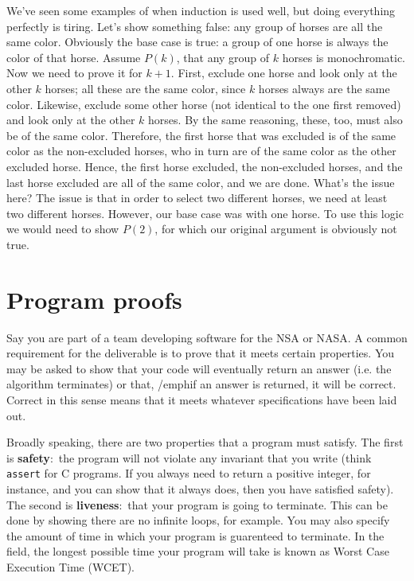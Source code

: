 \documentclass[nobib]{tufte-handout}
\newcommand{\defn}[2]{\noindent\textbf{#1}:\ #2}
\begin{document}
We've seen some examples of when induction is used well, but doing everything 
perfectly is tiring. Let's show something false: any group of horses are 
all the same color. Obviously the base case is true: a group of one horse 
is always the color of that horse. Assume $P(k)$, that any group of $k$ horses 
is monochromatic. Now we need to prove it for $k+1$. First, exclude one horse and 
look only at the other $k$ horses; all these are the same color, since $k$ horses 
always are the same color. Likewise, exclude some other horse (not identical to 
the one first removed) and look only at the other $k$ horses. By the same reasoning, 
these, too, must also be of the same color. Therefore, the first horse that 
was excluded is of the same color as the non-excluded horses, who in turn are 
of the same color as the other excluded horse. Hence, the first horse excluded, 
the non-excluded horses, and the last horse excluded are all of the same color, 
and we are done. What's the issue here? The issue is that in order to select two different 
horses, we need at least two different horses. However, our base case was with one horse. 
To use this logic we would need to show $P(2)$, for which our original argument is
obviously not true. 

\section{Program proofs}

Say you are part of a team developing software for the NSA or NASA. 
A common requirement for the deliverable is to prove that it meets 
certain properties. You may be asked to show that your code 
will eventually return an answer (i.e. the algorithm terminates)
or that, /emph{if} an answer is returned, it will be correct. 
Correct in this sense means that it meets whatever specifications 
have been laid out. 

Broadly speaking, there are two properties that a program must 
satisfy. The first is 
\defn{safety}{the program will not violate any invariant that you write 
(think \texttt{assert} for C programs. If you always need to return 
a positive integer, for instance, and you can show that it always does, 
then you have satisfied safety)}. The second is 
\defn{liveness}{that your program is going to terminate}. This can be 
done by showing there are no infinite loops, for example. You may also specify
the amount of time in which your program is guarenteed to terminate. 
In the field, the longest possible time your program will take 
is known as Worst Case Execution Time (WCET).
\end{document}
